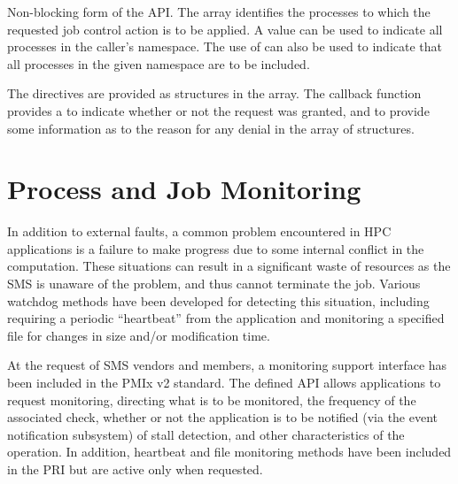 \optattrend

\descr

Non-blocking form of the  \ac{API}.
The  array identifies the processes to which the requested job control action is to be applied.
A  value can be used to indicate all processes in the caller's namespace.
The use of  can also be used to indicate that all processes in the given namespace are to be included.

The directives are provided as  structures in the  array.
The callback function provides a  to indicate whether or not the request was granted, and to provide some information as to the reason for any denial in the  array of  structures.



\section{Process and Job Monitoring}
\label{chap:api_job_mgmt:monitor}

In addition to external faults, a common problem encountered in \ac{HPC} applications is a failure to make
progress due to some internal conflict in the computation. These situations can
result in a significant waste of resources as the \ac{SMS} is unaware of the problem, and thus cannot terminate the
job. Various watchdog methods have been developed for detecting this situation, including requiring a periodic ``heartbeat''
from the application and monitoring a specified file for changes in size and/or modification time.

At the request of \ac{SMS} vendors and members, a monitoring support interface has been included in the PMIx v2 standard. The defined \ac{API} allows applications to request monitoring, directing what is to be monitored, the frequency of the associated check, whether or not the application is to be notified (via the event notification subsystem) of stall detection, and other characteristics of the operation. In addition, heartbeat and file monitoring methods have been included in the \ac{PRI} but are active only when requested.

\subsection{}

